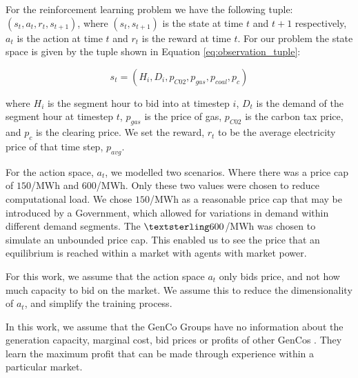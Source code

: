 \documentclass[conference]{IEEEtran}
\begin{document}
For the reinforcement learning problem we have the following tuple: $(s_t,a_t,r_t,s_{t+1})$, where $(s_t, s_{t+1})$ is the state at time $t$ and $t+1$ respectively, $a_t$ is the action at time $t$ and $r_t$ is the reward at time $t$. For our problem the state space is given by the tuple shown in Equation \ref{eq:observation_tuple}:

\begin{equation}
\label{eq:observation_tuple}
	s_t=(H_i,D_i,p_{C02},p_{gas},p_{coal},p_{c})
\end{equation}

\noindent where $H_i$ is the segment hour to bid into at timestep $i$, $D_t$ is the demand of the segment hour at timestep $t$, $p_{gas}$ is the price of gas, $p_{C02}$ is the carbon tax price, and $p_{c}$ is the clearing price. We set the reward, $r_t$ to be the average electricity price of that time step, $p_{avg}$.

For the action space, $a_t$, we modelled two scenarios. Where there was a price cap of \textsterling$150$/MWh and \textsterling$600$/MWh. Only these two values were chosen to reduce computational load. We chose \textsterling$150$/MWh as a reasonable price cap that may be introduced by a Government, which allowed for variations in demand within different demand segments. The $\textsterling 600$/MWh was chosen to simulate an unbounded price cap. This enabled us to see the price that an equilibrium is reached within a market with agents with market power. 

For this work, we assume that the action space $a_t$ only bids price, and not how much capacity to bid on the market. We assume this to reduce the dimensionality of $a_t$, and simplify the training process.

In this work, we assume that the GenCo Groups have no information about the generation capacity, marginal cost, bid prices or profits of other GenCos \cite{EsmaeiliAliabadi2017}. They learn the maximum profit that can be made through experience within a particular market.


\end{document}
